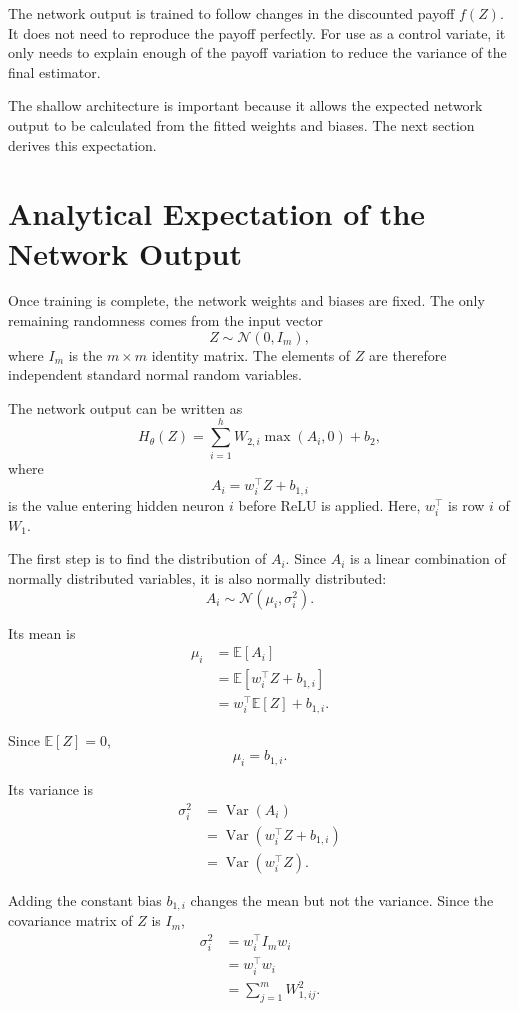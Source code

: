 The network output is trained to follow changes in the discounted payoff \(f(Z)\). It does not need to reproduce the payoff perfectly. For use as a control variate, it only needs to explain enough of the payoff variation to reduce the variance of the final estimator.

The shallow architecture is important because it allows the expected network output to be calculated from the fitted weights and biases. The next section derives this expectation.

\section{Analytical Expectation of the Network Output}
\label{sec:analytical-network-expectation}

Once training is complete, the network weights and biases are fixed. The only remaining randomness comes from the input vector
\[
Z\sim\mathcal{N}(0,I_m),
\]
where \(I_m\) is the \(m\times m\) identity matrix. The elements of \(Z\) are therefore independent standard normal random variables.

The network output can be written as
\[
H_\theta(Z)
=
\sum_{i=1}^{h}
W_{2,i}\max(A_i,0)+b_2,
\]
where
\[
A_i
=
w_i^\top Z+b_{1,i}
\]
is the value entering hidden neuron \(i\) before ReLU is applied. Here, \(w_i^\top\) is row \(i\) of \(W_1\).

The first step is to find the distribution of \(A_i\). Since \(A_i\) is a linear combination of normally distributed variables, it is also normally distributed:
\[
A_i
\sim
\mathcal{N}(\mu_i,\sigma_i^2).
\]

Its mean is
\[
\begin{aligned}
\mu_i
&=
\mathbb{E}[A_i] \\
&=
\mathbb{E}
\left[
w_i^\top Z+b_{1,i}
\right] \\
&=
w_i^\top\mathbb{E}[Z]+b_{1,i}.
\end{aligned}
\]

Since \(\mathbb{E}[Z]=0\),
\[
\mu_i=b_{1,i}.
\]

Its variance is
\[
\begin{aligned}
\sigma_i^2
&=
\operatorname{Var}(A_i) \\
&=
\operatorname{Var}
\left(
w_i^\top Z+b_{1,i}
\right) \\
&=
\operatorname{Var}
\left(
w_i^\top Z
\right).
\end{aligned}
\]

Adding the constant bias \(b_{1,i}\) changes the mean but not the variance. Since the covariance matrix of \(Z\) is \(I_m\),
\[
\begin{aligned}
\sigma_i^2
&=
w_i^\top I_m w_i \\
&=
w_i^\top w_i \\
&=
\sum_{j=1}^{m}W_{1,ij}^{2}.
\end{aligned}
\]

